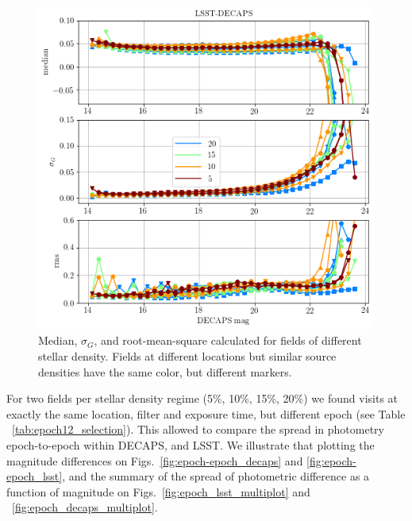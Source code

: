 \documentclass[DM,lsstdraft,toc,usenatbib]{lsstdoc}
\begin{document}
\begin{figure}
\includegraphics[width=0.7\columnwidth]{figs/17_decaps_lsst_rms_plot.png}
\caption{Median, $\sigma_{G}$, and root-mean-square calculated for fields of different stellar density. Fields at different locations but similar source densities have the same color, but different markers. }
\label{fig:dmag_spread}
\end{figure} 



For two fields per  stellar density regime (5\%, 10\%, 15\%, 20\%) we found visits at exactly the same location, filter and exposure time, but different epoch (see Table ~\ref{tab:epoch12_selection}).  This allowed to compare the spread in photometry epoch-to-epoch  within DECAPS, and LSST. We illustrate that plotting the magnitude differences on Figs.~\ref{fig:epoch-epoch_decaps} and \ref{fig:epoch-epoch_lsst}, and the summary of the spread of photometric difference as a function of magnitude on Figs.~\ref{fig:epoch_lsst_multiplot} and ~\ref{fig:epoch_decaps_multiplot}. 
\end{document}
